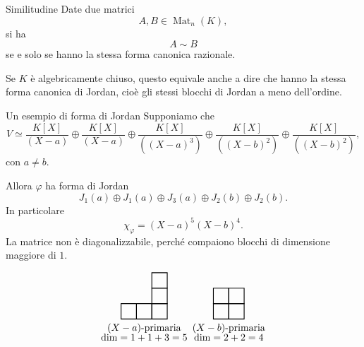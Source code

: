 \documentclass[a4paper]{article}
\begin{document}
\begin{radioactive}
\begin{snippetremark}{Similitudine}
    Date due matrici
    \[
        A,B\in \operatorname{Mat}_n(K),
    \]
    si ha
    \[
        A\sim B
    \]
    se e solo se hanno la stessa forma canonica razionale.

    Se \(K\) è algebricamente chiuso, questo equivale anche a dire che hanno la stessa forma canonica di Jordan, cioè gli stessi blocchi di Jordan a meno dell'ordine.
\end{snippetremark}
\end{radioactive}

\begin{radioactive}
\begin{snippetexample}{Un esempio di forma di Jordan}
    Supponiamo che
    \[
        V\simeq
        \frac{K[X]}{(X-a)}
        \oplus
        \frac{K[X]}{(X-a)}
        \oplus
        \frac{K[X]}{((X-a)^3)}
        \oplus
        \frac{K[X]}{((X-b)^2)}
        \oplus
        \frac{K[X]}{((X-b)^2)},
    \]
    con \(a\neq b\).

    Allora \(\varphi\) ha forma di Jordan
    \[
        J_1(a)\oplus J_1(a)\oplus J_3(a)\oplus J_2(b)\oplus J_2(b).
    \]
    In particolare
    \[
        \chi_\varphi=(X-a)^5(X-b)^4.
    \]
    La matrice non è diagonalizzabile, perché compaiono blocchi di dimensione maggiore di \(1\).
\end{snippetexample}
\end{radioactive}

\begin{radioactive}
\[
    \begin{tikzpicture}[scale=0.55]
        \foreach \x/\h in {0/1,1/1,2/3} {
            \foreach \y in {1,...,\h} {
                \draw[thick] (\x,\y-1) rectangle (\x+1,\y);
            }
        }
        \node at (1.5,-0.6) {\((X-a)\)-primaria};
        \node at (1.5,-1.2) {\(\dim=1+1+3=5\)};

        \begin{scope}[xshift=6cm]
            \foreach \x/\h in {0/2,1/2} {
                \foreach \y in {1,...,\h} {
                    \draw[thick] (\x,\y-1) rectangle (\x+1,\y);
                }
            }
            \node at (1,-0.6) {\((X-b)\)-primaria};
            \node at (1,-1.2) {\(\dim=2+2=4\)};
        \end{scope}
    \end{tikzpicture}
\]
\end{radioactive}
\end{document}

